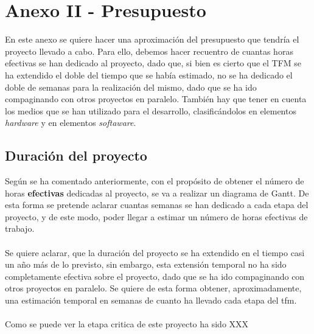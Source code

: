 \chapter{Anexo II - Presupuesto}

En este anexo se quiere hacer una aproximación del presupuesto que tendría el proyecto llevado a cabo. Para ello, debemos hacer recuentro de cuantas horas efectivas se han dedicado al proyecto, dado que, si bien es cierto que el TFM se ha extendido el doble del tiempo que se había estimado, no se ha dedicado el doble de semanas para la realización del mismo, dado que se ha ido compaginando con otros proyectos en paralelo. También hay que tener en cuenta los medios que se han utilizado para el desarrollo, clasificándolos en elementos \textit{hardware} y en elementos \textit{softaware}.

\section{Duración del proyecto}


Según se ha comentado anteriormente, con el propósito de obtener el número de horas \textbf{efectivas} dedicadas al proyecto, se va a realizar un diagrama de Gantt. De esta forma se pretende aclarar cuantas semanas se han dedicado a cada etapa del proyecto, y de este modo, poder llegar a estimar un número de horas efectivas de trabajo.\\
\\
Se quiere aclarar, que la duración del proyecto se ha extendido en el tiempo casi un año más de lo previsto, sin embargo, esta extensión temporal no ha sido completamente efectiva sobre el proyecto, dado que se ha ido compaginando con otros proyectos en paralelo. Se quiere de esta forma obtener, aproximadamente, una estimación temporal en semanas de cuanto ha llevado cada etapa del \gls{tfm}.\\
\\
Como se puede ver la etapa critica de este proyecto ha sido XXX

\newpage


